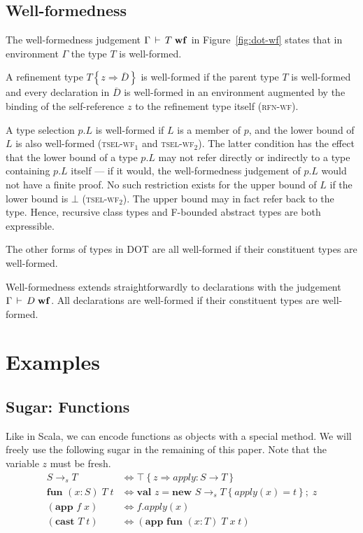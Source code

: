 \documentclass[9pt]{sigplanconf}
\newcommand{\mi}[1]{\mathit{#1}}
\newcommand{\figref}[1]
        {Figure~\ref{fig:#1}}
\newcommand{\ts}{\,\vdash\,}
\newcommand{\wf}{\;\mbox{\textbf{wf}}}
\newcommand{\tfun}{\rightarrow}
\newcommand{\refine}[2]{\left\{#1 \Rightarrow #2 \right\}}
\newcommand{\ldefs}[1]{\left\{#1\right\}}
\newcommand{\seq}[1]{\overline{#1}}
\newcommand{\mapp}[3]{#1.#2(#3)}
\newcommand{\new}[3]{\textbf{val }#1 = \textbf{new }#2 ;\; #3}
\newcommand{\mdecl}[3]{#1 : #2 \tfun #3}
\newcommand{\Top}{\top}%
\newcommand{\arrow}[2]{#1\rightarrow_s#2}
\newcommand{\fun}[4]{\textbf{fun } (#1:#2)\;#3\;#4}
\newcommand{\app}[2]{(\textbf{app }#1\;#2)}
\newcommand{\cast}[2]{(\textbf{cast }#1\;#2)}
\begin{document}
\subsection{Well-formedness}

The well-formedness judgement $\Gamma \ts T \wf$ in \figref{dot-wf}
states that in environment $\Gamma$ the type $T$ is
well-formed.

A refinement type $T \refine z {\seq D}$ is
well-formed if the parent type $T$ is well-formed and every
declaration in $\seq D$ is well-formed in an environment augmented by
the binding of the self-reference $z$ to the refinement type itself
(\textsc{rfn-wf}).

A type selection $p.L$ is well-formed if $L$ is a member of $p$, and
the lower bound of $L$ is also well-formed (\textsc{tsel-wf$_1$} and
\textsc{tsel-wf$_2$}). The latter condition has the effect that the
lower bound of a type $p.L$ may not refer directly or indirectly to a
type containing $p.L$ itself --- if it would, the well-formedness
judgement of $p.L$ would not have a finite proof. No such restriction
exists for the upper bound of $L$ if the lower bound is $\bot$
(\textsc{tsel-wf$_2$}). The upper bound may in fact refer back to the
type. Hence, recursive class types and F-bounded abstract types are
both expressible.

The other forms of types in DOT are all well-formed if their
constituent types are well-formed.

Well-formedness extends straightforwardly to declarations with the
judgement $\Gamma \ts D \wf$. All declarations are well-formed if
their constituent types are well-formed.

\section{Examples}\label{dot-examples}

\subsection{Sugar: Functions}
Like in Scala, we can encode functions as objects with a special
method. We will freely use the following sugar in the remaining of
this paper. Note that the variable $z$ must be fresh.
\begin{align*}
\arrow S T &\iff {\Top \refine z {\mdecl {\mi{apply}} S T}}\\
\fun x S T t &\iff \new z {{\arrow S T}\ldefs{\mi{apply}(x) = t}} z\\
\app f x &\iff \mapp f {\mi{apply}} x\\
\cast T t&\iff \app {\fun x T T x} t
\end{align*}
\end{document}
